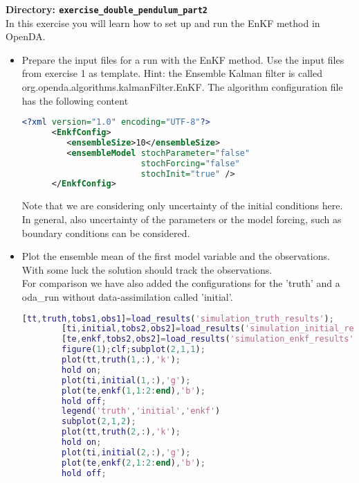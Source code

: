 {\bf Directory: {\tt exercise\_double\_pendulum\_part2}}\\

In this exercise you will learn how to set up and run the EnKF method in OpenDA.

\begin{itemize}
  \item Prepare the input files for a run with the EnKF method. Use the input
        files from exercise 1 as template. Hint: the Ensemble Kalman filter
        is called org.openda.algorithms.kalmanFilter.EnKF. The algorithm
        configuration file has the following content
      \begin{lstlisting}[language=XML,frame=single,caption={XML-input for EnKF algorithm}]
      <?xml version="1.0" encoding="UTF-8"?>
      <EnkfConfig>
         <ensembleSize>10</ensembleSize>
         <ensembleModel stochParameter="false"
                        stochForcing="false"
                        stochInit="true" />
      </EnkfConfig>
      \end{lstlisting}
      Note that we are considering only uncertainty of the initial conditions here. In general, also uncertainty of the 
      parameters or the model forcing, such as boundary conditions can be considered.

  \item Plot the ensemble mean of the first model variable and the observations.
        With some luck the solution should track the observations. \\
        For comparison we have also added the configurations for the 'truth' and a oda\_run
        without data-assimilation called 'initial'.
        
\ifshowmatlab
        \begin{lstlisting}[language=Matlab,frame=single,caption={Matlab}]
        [tt,truth,tobs1,obs1]=load_results('simulation_truth_results');
        [ti,initial,tobs2,obs2]=load_results('simulation_initial_results');
        [te,enkf,tobs2,obs2]=load_results('simulation_enkf_results');
        figure(1);clf;subplot(2,1,1);
        plot(tt,truth(1,:),'k');
        hold on;
        plot(ti,initial(1,:),'g');
        plot(te,enkf(1,1:2:end),'b');
        hold off;
        legend('truth','initial','enkf')
        subplot(2,1,2);
        plot(tt,truth(2,:),'k');
        hold on;
        plot(ti,initial(2,:),'g');
        plot(te,enkf(2,1:2:end),'b');
        hold off;
        \end{lstlisting}
\fi


\end{itemize}
